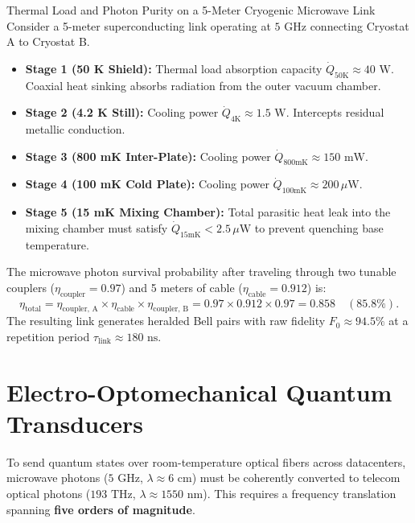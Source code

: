\begin{examplebox}{Thermal Load and Photon Purity on a 5-Meter Cryogenic Microwave Link}
Consider a 5-meter superconducting link operating at $5\text{ GHz}$ connecting Cryostat A to Cryostat B.
\begin{itemize}
    \item \textbf{Stage 1 (50 K Shield):} Thermal load absorption capacity $\dot{Q}_{50\text{K}} \approx 40\text{ W}$. Coaxial heat sinking absorbs radiation from the outer vacuum chamber.
    \item \textbf{Stage 2 (4.2 K Still):} Cooling power $\dot{Q}_{4\text{K}} \approx 1.5\text{ W}$. Intercepts residual metallic conduction.
    \item \textbf{Stage 3 (800 mK Inter-Plate):} Cooling power $\dot{Q}_{800\text{mK}} \approx 150\text{ mW}$.
    \item \textbf{Stage 4 (100 mK Cold Plate):} Cooling power $\dot{Q}_{100\text{mK}} \approx 200\,\mu\text{W}$.
    \item \textbf{Stage 5 (15 mK Mixing Chamber):} Total parasitic heat leak into the mixing chamber must satisfy $\dot{Q}_{15\text{mK}} < 2.5\,\mu\text{W}$ to prevent quenching base temperature.
\end{itemize}
The microwave photon survival probability after traveling through two tunable couplers ($\eta_{\text{coupler}} = 0.97$) and 5 meters of cable ($\eta_{\text{cable}} = 0.912$) is:
\begin{equation}
    \eta_{\text{total}} = \eta_{\text{coupler, A}} \times \eta_{\text{cable}} \times \eta_{\text{coupler, B}} = 0.97 \times 0.912 \times 0.97 = 0.858 \quad (85.8\%).
\end{equation}
The resulting link generates heralded Bell pairs with raw fidelity $F_0 \approx 94.5\%$ at a repetition period $\tau_{\text{link}} \approx 180\text{ ns}$.
\end{examplebox}


\section{Electro-Optomechanical Quantum Transducers}
\label{sec:optomechanical_transducers}

To send quantum states over room-temperature optical fibers across datacenters, microwave photons ($5\text{ GHz}$, $\lambda \approx 6\text{ cm}$) must be coherently converted to telecom optical photons ($193\text{ THz}$, $\lambda \approx 1550\text{ nm}$). This requires a frequency translation spanning \textbf{five orders of magnitude}.


